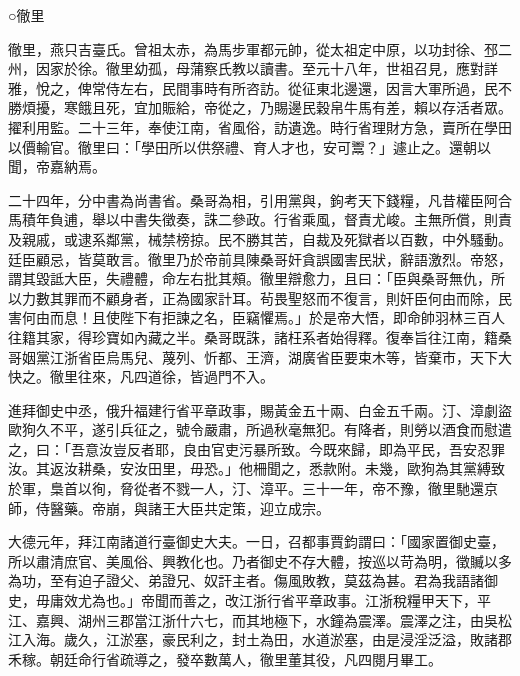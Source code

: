 
\begin{pinyinscope}

 ○徹里



 徹里，燕只吉臺氏。曾祖太赤，為馬步軍都元帥，從太祖定中原，以功封徐、邳二州，因家於徐。徹里幼孤，母蒲察氏教以讀書。至元十八年，世祖召見，應對詳雅，悅之，俾常侍左右，民間事時有所咨訪。從征東北邊還，因言大軍所過，民不勝煩擾，寒餓且死，宜加賑給，帝從之，乃賜邊民穀帛牛馬有差，賴以存活者眾。擢利用監。二十三年，奉使江南，省風俗，訪遺逸。時行省理財方急，賣所在學田以價輸官。徹里曰：「學田所以供祭禮、育人才也，安可鬻？」遽止之。還朝以聞，帝嘉納焉。



 二十四年，分中書為尚書省。桑哥為相，引用黨與，鉤考天下錢糧，凡昔權臣阿合馬積年負逋，舉以中書失徵奏，誅二參政。行省乘風，督責尤峻。主無所償，則責及親戚，或逮系鄰黨，械禁榜掠。民不勝其苦，自裁及死獄者以百數，中外騷動。廷臣顧忌，皆莫敢言。徹里乃於帝前具陳桑哥奸貪誤國害民狀，辭語激烈。帝怒，謂其毀詆大臣，失禮體，命左右批其頰。徹里辯愈力，且曰：「臣與桑哥無仇，所以力數其罪而不顧身者，正為國家計耳。茍畏聖怒而不復言，則奸臣何由而除，民害何由而息！且使陛下有拒諫之名，臣竊懼焉。」於是帝大悟，即命帥羽林三百人往籍其家，得珍寶如內藏之半。桑哥既誅，諸枉系者始得釋。復奉旨往江南，籍桑哥姻黨江浙省臣烏馬兒、蔑列、忻都、王濟，湖廣省臣要束木等，皆棄市，天下大快之。徹里往來，凡四道徐，皆過門不入。



 進拜御史中丞，俄升福建行省平章政事，賜黃金五十兩、白金五千兩。汀、漳劇盜歐狗久不平，遂引兵征之，號令嚴肅，所過秋毫無犯。有降者，則勞以酒食而慰遣之，曰：「吾意汝豈反者耶，良由官吏污暴所致。今既來歸，即為平民，吾安忍罪汝。其返汝耕桑，安汝田里，毋恐。」他柵聞之，悉款附。未幾，歐狗為其黨縛致於軍，梟首以徇，脅從者不戮一人，汀、漳平。三十一年，帝不豫，徹里馳還京師，侍醫藥。帝崩，與諸王大臣共定策，迎立成宗。



 大德元年，拜江南諸道行臺御史大夫。一日，召都事賈鈞謂曰：「國家置御史臺，所以肅清庶官、美風俗、興教化也。乃者御史不存大體，按巡以苛為明，徵贓以多為功，至有迫子證父、弟證兄、奴訐主者。傷風敗教，莫茲為甚。君為我語諸御史，毋庸效尤為也。」帝聞而善之，改江浙行省平章政事。江浙稅糧甲天下，平江、嘉興、湖州三郡當江浙什六七，而其地極下，水鐘為震澤。震澤之注，由吳松江入海。歲久，江淤塞，豪民利之，封土為田，水道淤塞，由是浸淫泛溢，敗諸郡禾稼。朝廷命行省疏導之，發卒數萬人，徹里董其役，凡四閱月畢工。




\end{pinyinscope}
